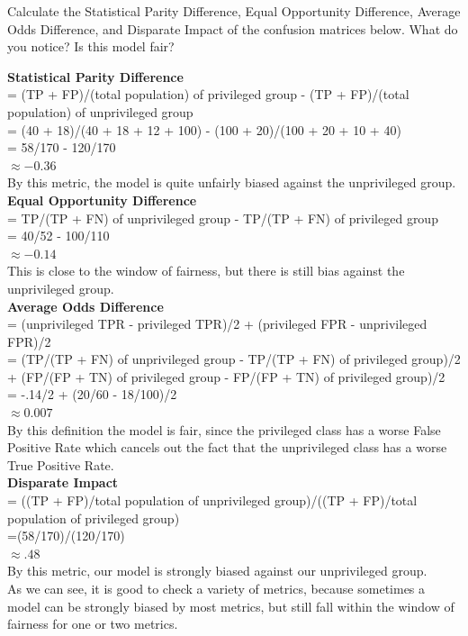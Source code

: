 \documentclass[assignment03_Solutions]{subfiles}
\begin{document}
\begin{exercise}[(60 Minutes)]
\bes
\item Calculate the Statistical Parity Difference, Equal Opportunity Difference, Average Odds Difference, and Disparate Impact of the confusion matrices below. What do you notice? Is this model fair?



\begin{boxedsolution}
\textbf{Statistical Parity Difference}\\
= (TP + FP)/(total population) of privileged group - (TP + FP)/(total population) of unprivileged group\\
=  (40 + 18)/(40 + 18 + 12 + 100) - (100 + 20)/(100 + 20 + 10 + 40)\\
= 58/170 - 120/170\\
$\approx -0.36$\\
By this metric, the model is quite unfairly biased against the unprivileged group.\\
\textbf{Equal Opportunity Difference}\\
= TP/(TP + FN) of unprivileged group - TP/(TP + FN) of privileged group\\
= 40/52 - 100/110\\
$\approx -0.14$\\
This is close to the window of fairness, but there is still bias against the unprivileged group.\\
\textbf{Average Odds Difference}\\
= (unprivileged TPR - privileged TPR)/2 + (privileged FPR - unprivileged FPR)/2\\
= (TP/(TP + FN) of unprivileged group - TP/(TP + FN) of privileged group)/2 + (FP/(FP + TN) of privileged group - FP/(FP + TN) of privileged group)/2\\
= -.14/2 + (20/60 - 18/100)/2\\
$\approx 0.007$\\
By this definition the model is fair, since the privileged class has a worse False Positive Rate which cancels out the fact that the unprivileged class has a worse True Positive Rate.\\
\textbf{Disparate Impact}\\
= ((TP + FP)/total population of unprivileged group)/((TP + FP)/total population of privileged group)\\
=(58/170)/(120/170)\\
$\approx .48$\\
By this metric, our model is strongly biased against our unprivileged group.\\
As we can see, it is good to check a variety of metrics, because sometimes a model can be strongly biased by most metrics, but still fall within the window of fairness for one or two metrics.
\end{boxedsolution}


\end{exercise}
\end{document}
